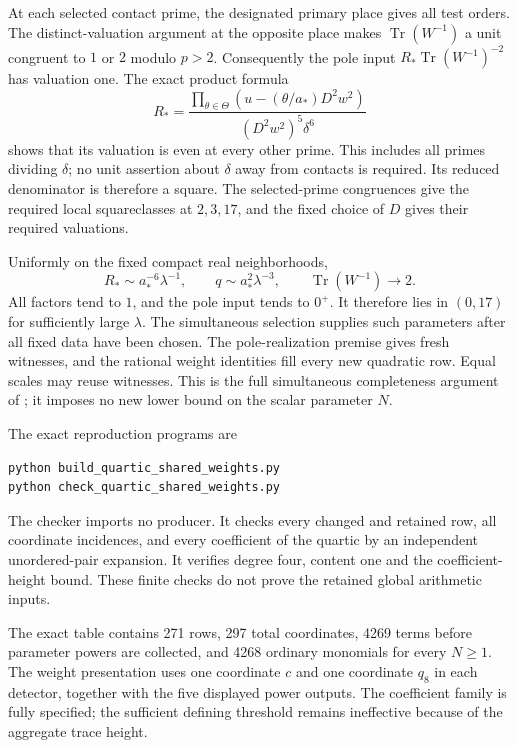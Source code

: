 \documentclass[11pt,a4paper]{article}
\theoremstyle{remark}\newtheorem{remark}[theorem]{Remark}
\DeclareMathOperator{\Tr}{Tr}
\begin{document}
At each selected contact prime, the designated primary place gives
all test orders. The distinct-valuation argument at the opposite place
makes $\Tr(W^{-1})$ a unit congruent to $1$ or $2$ modulo $p>2$.
Consequently the pole input $R_*\Tr(W^{-1})^{-2}$ has valuation one.
The exact product formula
\[
 R_*=\frac{\prod_{\theta\in\Theta}(u-(\theta/a_*)D^2w^2)}
               {(D^2w^2)^5\delta^6}
\]
shows that its valuation is even at every other prime. This includes
all primes dividing $\delta$; no unit assertion about $\delta$ away from
contacts is required. Its reduced denominator is therefore a square.
The selected-prime congruences give the required local squareclasses
at $2,3,17$, and the fixed choice of $D$ gives their required valuations.

Uniformly on the fixed compact real neighborhoods,
\[
 R_*\sim a_*^{-6}\lambda^{-1},\qquad q\sim a_*^2\lambda^{-3},
 \qquad \Tr(W^{-1})\longrightarrow2.
\]
All factors tend to $1$, and the pole input tends to $0^+$. It therefore
lies in $(0,17)$ for sufficiently large $\lambda$. The simultaneous
selection supplies such parameters after all fixed data have been chosen.
The pole-realization premise gives fresh witnesses, and the rational
weight identities fill every new quadratic row. Equal scales may reuse
witnesses. This is the full simultaneous completeness argument of
\cite[Proposition 3.2]{Shared}; it imposes no new lower bound on the
scalar parameter $N$.

The exact reproduction programs are
\begin{verbatim}
python build_quartic_shared_weights.py
python check_quartic_shared_weights.py
\end{verbatim}
The checker imports no producer. It checks every changed and retained
row, all coordinate incidences, and every coefficient of the quartic by
an independent unordered-pair expansion. It verifies degree four,
content one and the coefficient-height bound. These finite checks do
not prove the retained global arithmetic inputs.

The exact table contains 271 rows, 297 total coordinates, 4269 terms
before parameter powers are collected, and 4268 ordinary monomials for
every $N\ge1$. The weight presentation uses one coordinate $c$ and one coordinate
$q_8$ in each detector, together with the five displayed power outputs.
The coefficient family is fully specified; the sufficient defining
threshold remains ineffective because of the aggregate trace height.
\end{document}
